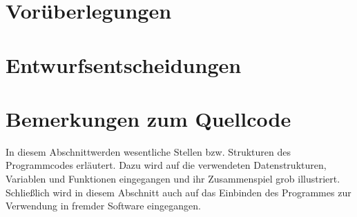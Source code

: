 \documentclass[12pt,a4paper]{article}
\begin{document}
\section{Vorüberlegungen}
	
\clearpage
\section{Entwurfsentscheidungen}\label{sec:entwurf}
	
	
	
	
%
%
\clearpage
\section{Bemerkungen zum Quellcode}\label{sec:code}
In diesem Abschnittwerden wesentliche Stellen bzw. Strukturen des Programmcodes erläutert. Dazu wird auf die verwendeten Datenstrukturen, Variablen und Funktionen eingegangen und ihr Zusammenspiel grob illustriert. Schließlich wird in diesem Abschnitt auch auf das Einbinden des Programmes zur Verwendung in fremder Software eingegangen.
	
	
	
%
%
\clearpage


\newpage
\nocite{*}
\printbibliography
\end{document}
